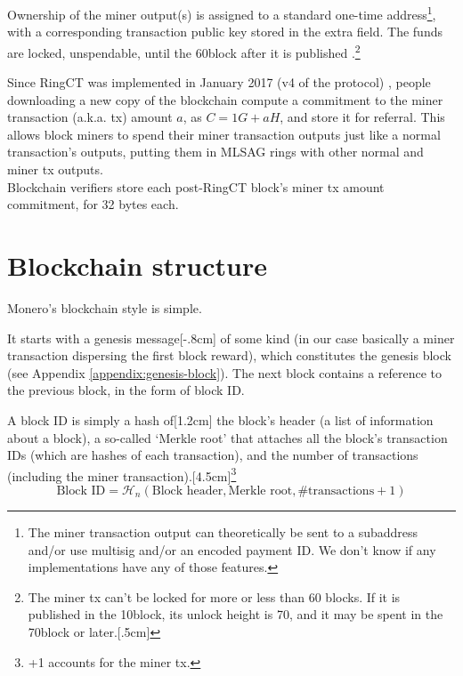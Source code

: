 Ownership of the miner output(s) is assigned to a standard one-time address\footnote{The miner transaction output can theoretically be sent to a subaddress and/or use multisig and/or an encoded payment ID. We don't know if any implementations have any of those features.}, with a corresponding transaction public key stored in the extra field. The funds are locked, unspendable, until the 60\nth block after it is published \cite{transaction-lock}.\footnote{The miner tx can't be locked for more or less than 60 blocks. If it is published in the 10\nth block, its unlock height is 70, and it may be spent in the 70\nth block or later.[.5cm]}%

Since RingCT was implemented in January 2017 (v4 of the protocol) \cite{ringct-dates}, people downloading a new copy of the blockchain compute a commitment to the miner transaction (a.k.a. tx) amount $a$, as $C = 1G + aH$, and store it for referral. This allows block miners to spend their miner transaction outputs just like a normal transaction's outputs, putting them in MLSAG rings with other normal and miner tx outputs.\\

Blockchain verifiers store each post-RingCT block's miner tx amount commitment, for 32 bytes each.



\section{Blockchain structure}
\label{sec:blockchain-structure}

Monero's blockchain style is simple.

It starts with a genesis message[-.8cm] of some kind (in our case basically a miner transaction dispersing the first block reward), which constitutes the genesis block (see Appendix \ref{appendix:genesis-block}). The next block contains a reference to the previous block, in the form of block ID.

A block ID is simply a hash of[1.2cm] the block's header (a list of information about a block), a so-called `Merkle root' that attaches all the block's transaction IDs (which are hashes of each transaction), and the number of transactions (including the miner transaction).[4.5cm]\footnote{+1 accounts for the miner tx.}\vspace{.175cm}
\[\textrm{Block ID} = \mathcal{H}_n(\textrm{Block header}, \textrm{Merkle root}, \# \textrm{transactions} + 1)\]\vspace{.05cm}

